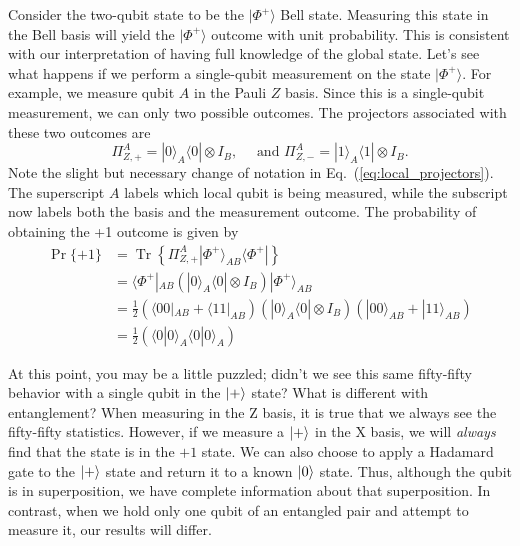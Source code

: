 Consider the two-qubit state to be the $|\Phi^+\rangle$ Bell state.
Measuring this state in the Bell basis will yield the $|\Phi^+\rangle$ outcome with unit probability.
This is consistent with our interpretation of having full knowledge of the global state.
Let's see what happens if we perform a single-qubit measurement on the state $|\Phi^+\rangle$.
For example, we measure qubit $A$ in the Pauli $Z$ basis.
Since this is a single-qubit measurement, we can only two possible outcomes.
The projectors associated with these two outcomes are
\begin{equation}
    \Pi^A_{Z,+} = |0\rangle_A\langle0| \otimes I_B, \quad \text{ and } \Pi^A_{Z,-} = |1\rangle_A\langle1| \otimes I_B.
    \label{eq:local_projectors}
\end{equation}
Note the slight but necessary change of notation in Eq.~(\ref{eq:local_projectors}).
The superscript $A$ labels which local qubit is being measured, while the subscript now labels both the basis and the measurement outcome.
The probability of obtaining the +1 outcome is given by
\begin{align}
    \operatorname{Pr}\{+1\} & = \operatorname{Tr}\left\{\Pi^A_{Z,+} |\Phi^+\rangle_{AB}\langle\Phi^+|\right\} \\
    & = \langle\Phi^+|_{AB} \left( |0\rangle_A\langle0| \otimes I_B \right) |\Phi^+\rangle_{AB} \nonumber\\
    & = \frac{1}{2} \left( \langle00|_{AB} + \langle11|_{AB} \right) \left( |0\rangle_A\langle0| \otimes I_B \right) \left( |00\rangle_{AB} + |11\rangle_{AB} \right) \nonumber\\
    & = \frac{1}{2} \left( \langle0|0\rangle_A\langle0|0\rangle_A \right)
\end{align}

\label{page:plus-is-pure}
At this point, you may be a little puzzled; didn't we see this same fifty-fifty behavior with a single qubit in the $\left| + \right\rangle$ state?  What is different with entanglement?  When measuring in the Z basis, it is true that we always see the fifty-fifty statistics.  However, if we measure a $\left| + \right\rangle$ in the X basis, we will \emph{always} find that the state is in the $+1$ state.  We can also choose to apply a Hadamard gate to the $\left| + \right\rangle$ state and return it to a known $\left| 0 \right\rangle$ state.  Thus, although the qubit is in superposition, we have complete information about that superposition.  In contrast, when we hold only one qubit of an entangled pair and attempt to measure it, our results will differ.


